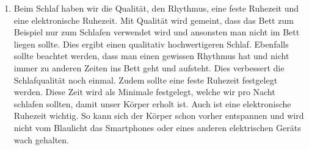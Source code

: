\begin{enumerate}
  \item Beim Schlaf haben wir die Qualität, den Rhythmus, eine feste Ruhezeit und eine elektronische Ruhezeit. Mit Qualität wird gemeint, dass das Bett zum Beispiel nur zum Schlafen verwendet wird und ansonsten man nicht im Bett liegen sollte. Dies ergibt einen qualitativ hochwertigeren Schlaf. Ebenfalls sollte  beachtet  werden, dass man einen gewissen Rhythmus hat und nicht immer zu anderen Zeiten ins Bett geht und aufsteht. Dies verbessert die Schlafqualität noch einmal. Zudem sollte eine feste Ruhezeit festgelegt werden. Diese Zeit wird als Minimale festgelegt, welche wir pro Nacht schlafen sollten, damit unser Körper erholt ist. Auch ist eine elektronische Ruhezeit wichtig. So kann sich der Körper schon vorher entspannen und wird nicht vom Blaulicht das Smartphones oder eines anderen elektrischen Geräts wach gehalten.
\end{enumerate}